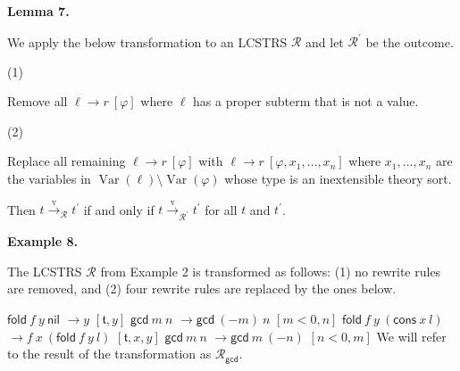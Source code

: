\documentclass[10pt,a4paper]{amsart}
\begin{document}
\par\medskip\noindent\textbf{Lemma 7.}\par
 
 
We apply the below transformation to an LCSTRS $\mathcal{R}$ and let $\mathcal{R}^{\prime}$ be the outcome.\par
  
\par\noindent  (1) 
 
Remove all ${\ell}\rightarrow{r}\ [\varphi]$ where $\ell$ has a proper subterm that is not a value.\par
 
 
 
\par\noindent  (2) 
 
Replace all remaining ${\ell}\rightarrow{r}\ [\varphi]$ with ${\ell}\rightarrow{r}\ [\varphi,{x}_{1},\ldots,{x}_{n}]$ where ${x}_{1},\ldots,{x}_{n}$ are the variables in $\operatorname{Var}(\ell)\setminus\operatorname{Var}(\varphi)$ whose type is an inextensible theory sort.\par
 
 
  
Then $t\xrightarrow{\scriptscriptstyle\mathrm{v}}_{\mathcal{R}}t^{\prime}$ if and only if $t\xrightarrow{\scriptscriptstyle\mathrm{v}}_{\mathcal{R}^{\prime}}t^{\prime}$ for all $t$ and $t^{\prime}$.\par
 
 
 
 
\par\medskip\noindent\textbf{Example 8.}\par
 
 
The LCSTRS $\mathcal{R}$ from Example 2 is transformed as follows: (1) no rewrite rules are removed, and (2) four rewrite rules are replaced by the ones below.\par
    $\displaystyle{{{\mathsf{fold}}\ {f}}\ {y}}\ {\mathsf{nil}}$ $\displaystyle\rightarrow y$ $\displaystyle[\mathfrak{t},y]$ $\displaystyle{{\mathsf{gcd}}\ {m}}\ {n}$ $\displaystyle\rightarrow{{\mathsf{gcd}}\ {(-m)}}\ {n}$ $\displaystyle[m<0,n]$     $\displaystyle{{{\mathsf{fold}}\ {f}}\ {y}}\ {({{\mathsf{cons}}\ {x}}\ {l})}$ $\displaystyle\rightarrow{{f}\ {x}}\ {({{{\mathsf{fold}}\ {f}}\ {y}}\ {l})}$ $\displaystyle[\mathfrak{t},x,y]$ $\displaystyle{{\mathsf{gcd}}\ {m}}\ {n}$ $\displaystyle\rightarrow{{\mathsf{gcd}}\ {m}}\ {(-n)}$ $\displaystyle[n<0,m]$    
We will refer to the result of the transformation as $\mathcal{R}_{\mathsf{gcd}}$.\par
 
\end{document}
